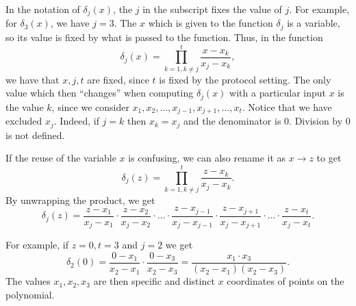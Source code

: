 \documentclass[parskip=half]{scrartcl}
\begin{document}
In the notation of $\delta_j(x)$, the $j$ in the subscript fixes the value of $j$.
For example, for $\delta_3(x)$, we have $j = 3$.
The $x$ which is given to the function $\delta_j$ is a variable, so its value is fixed by what is passed to the function.
Thus, in the function
\[
  \delta_j(x)=\prod_{k=1,k\neq j}^{t}\frac{x-x_k}{x_j-x_k},
\]
we have that $x, j, t$ are fixed, since $t$ is fixed by the protocol setting.
The only value which then \enquote{changes} when computing $\delta_j(x)$ with a particular input $x$ is the value $k$, since we consider $x_1, x_2, \dots, x_{j-1}, x_{j+1}, \dots, x_t$.
Notice that we have excluded $x_j$.
Indeed, if $j = k$ then $x_k = x_j$ and the denominator is $0$.
Division by $0$ is not defined.

If the reuse of the variable $x$ is confusing, we can also rename it as $x \to z$ to get
\[
  \delta_j(z)=\prod_{k=1,k\neq j}^{t}\frac{z-x_k}{x_j-x_k}.
\]
By unwrapping the product, we get
\[
  \delta_j(z)= \frac{z-x_1}{x_j - x_1} \cdot \frac{z-x_2}{x_j - x_2} \cdot
  \dots
  \cdot \frac{z-x_{j-1}}{x_j - x_{j-1}} \cdot \frac{z-x_{j+1}}{x_j - x_{j+1}} \cdot
  \dots
  \cdot \frac{z-x_t}{x_j - x_t}.
\]

For example, if $z = 0, t = 3$ and $j = 2$ we get
\[
  \delta_2(0) = \frac{0-x_1}{x_2 - x_1} \cdot \frac{0-x_3}{x_2 - x_3} =
  \frac{x_1 \cdot x_3}{(x_2 - x_1)(x_2 - x_3)}.
\]
The values $x_1, x_2, x_3$ are then specific and distinct $x$ coordinates of points on the polynomial.
\end{document}
